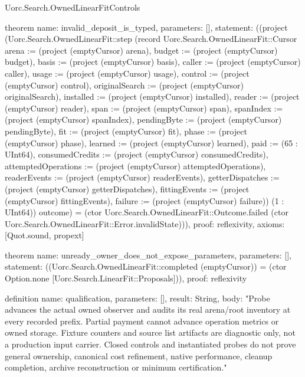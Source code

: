 \begin{lexlean}{Uorc.Search.OwnedLinearFitControls}
\begin{semanticmodule}
theorem{
  name: invalid_deposit_is_typed,
  parameters: [],
  statement: ((project (Uorc.Search.OwnedLinearFit::step (record Uorc.Search.OwnedLinearFit::Cursor {arena := (project (emptyCursor) arena), budget := (project (emptyCursor) budget), basis := (project (emptyCursor) basis), caller := (project (emptyCursor) caller), usage := (project (emptyCursor) usage), control := (project (emptyCursor) control), originalSearch := (project (emptyCursor) originalSearch), installed := (project (emptyCursor) installed), reader := (project (emptyCursor) reader), span := (project (emptyCursor) span), spanIndex := (project (emptyCursor) spanIndex), pendingByte := (project (emptyCursor) pendingByte), fit := (project (emptyCursor) fit), phase := (project (emptyCursor) phase), learned := (project (emptyCursor) learned), paid := (65 : UInt64), consumedCredits := (project (emptyCursor) consumedCredits), attemptedOperations := (project (emptyCursor) attemptedOperations), readerEvents := (project (emptyCursor) readerEvents), getterDispatches := (project (emptyCursor) getterDispatches), fittingEvents := (project (emptyCursor) fittingEvents), failure := (project (emptyCursor) failure)}) (1 : UInt64)) outcome) = (ctor Uorc.Search.OwnedLinearFit::Outcome.failed (ctor Uorc.Search.OwnedLinearFit::Error.invalidState))),
  proof: reflexivity{},
  axioms: [Quot.sound, propext]
}

theorem{
  name: unready_owner_does_not_expose_parameters,
  parameters: [],
  statement: ((Uorc.Search.OwnedLinearFit::completed (emptyCursor)) = (ctor Option.none [Uorc.Search.LinearFit::Proposals])),
  proof: reflexivity{}
}

definition{
  name: qualification,
  parameters: [],
  result: String,
  body: "Probe advances the actual owned observer and audits its real arena/root inventory at every recorded prefix. Partial payment cannot advance operation metrics or owned storage. Fixture counters and source list artifacts are diagnostic only, not a production input carrier. Closed controls and instantiated probes do not prove general ownership, canonical cost refinement, native performance, cleanup completion, archive reconstruction or minimum certification."
}
\end{semanticmodule}
\end{lexlean}
